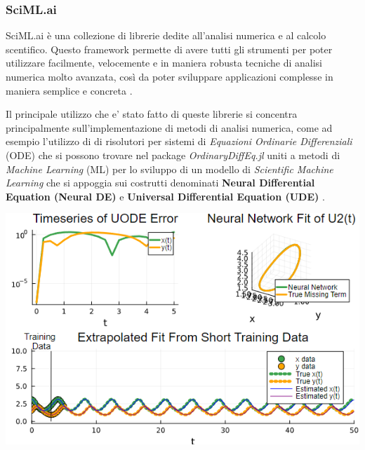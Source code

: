 \subsubsection{SciML.ai}


SciML.ai è una collezione di librerie dedite all'analisi numerica e 
al calcolo scentifico. Questo framework permette di 
avere tutti gli strumenti per poter utilizzare facilmente, 
velocemente e in maniera robusta tecniche di analisi numerica 
molto avanzata, così da poter sviluppare applicazioni complesse 
in maniera semplice e concreta
\cite{rackauckas2017differentialequations} 
\cite{rackauckas2019diffeqflux} 
\cite{rackauckas2020universal}. 

Il principale utilizzo che e' stato fatto di queste librerie si 
concentra principalmente sull'implementazione di metodi di analisi 
numerica, come ad esempio l'utilizzo di di risolutori per sistemi 
di \emph{Equazioni Ordinarie Differenziali} (ODE) che si possono 
trovare nel package \emph{OrdinaryDiffEq.jl} \cite{rackauckas2017differentialequations} 
uniti a metodi di \emph{Machine Learning} (ML) \cite{pal2023lux} \cite{Flux.jl-2018} \cite{innes:2018}
per lo sviluppo di un modello di \emph{Scientific Machine Learning} che si 
appoggia sui costrutti denominati \textbf{Neural Differential Equation (Neural DE)}
e \textbf{Universal Differential Equation (UDE)} 
\cite{rackauckas2019diffeqflux} \cite{rackauckas2020universal}. 

\begin{minipage}{\linewidth}
    \centering
    \includegraphics[width=\textwidth]{img/uode_cont.png}
    \label{fig:SciML_example}
\end{minipage}

